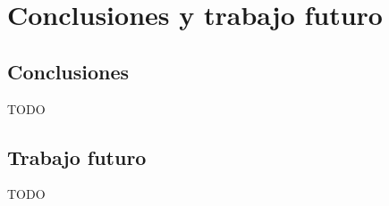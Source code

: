 \chapter{Conclusiones y trabajo futuro\label{CAP:CONCTRAB}}
  \section{Conclusiones\label{SEC:CONCLUSIONES}}
    TODO
  \section{Trabajo futuro\label{SEC:TRABAJO}}
    TODO